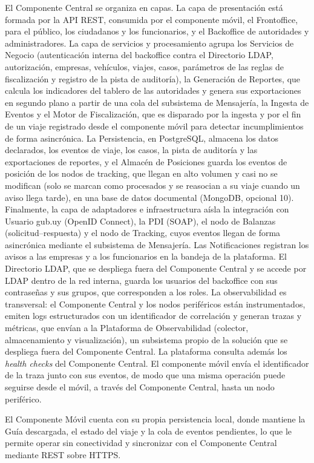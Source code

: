 El Componente Central se organiza en capas. La capa de presentación está formada por la API REST, consumida por el componente móvil, el Frontoffice, para el público, los ciudadanos y los funcionarios, y el Backoffice de autoridades y administradores. La capa de servicios y procesamiento agrupa los Servicios de Negocio (autenticación interna del backoffice contra el Directorio LDAP, autorización, empresas, vehículos, viajes, casos, parámetros de las reglas de fiscalización y registro de la pista de auditoría), la Generación de Reportes, que calcula los indicadores del tablero de las autoridades y genera sus exportaciones en segundo plano a partir de una cola del subsistema de Mensajería, la Ingesta de Eventos y el Motor de Fiscalización, que es disparado por la ingesta y por el fin de un viaje registrado desde el componente móvil para detectar incumplimientos de forma asincrónica. La Persistencia, en PostgreSQL, almacena los datos declarados, los eventos de viaje, los casos, la pista de auditoría y las exportaciones de reportes, y el Almacén de Posiciones guarda los eventos de posición de los nodos de tracking, que llegan en alto volumen y casi no se modifican (solo se marcan como procesados y se reasocian a su viaje cuando un aviso llega tarde), en una base de datos documental (MongoDB, opcional 10). Finalmente, la capa de adaptadores e infraestructura aísla la integración con Usuario gub.uy (OpenID Connect), la PDI (SOAP), el nodo de Balanzas (solicitud--respuesta) y el nodo de Tracking, cuyos eventos llegan de forma asincrónica mediante el subsistema de Mensajería. Las Notificaciones registran los avisos a las empresas y a los funcionarios en la bandeja de la plataforma. El Directorio LDAP, que se despliega fuera del Componente Central y se accede por LDAP dentro de la red interna, guarda los usuarios del backoffice con sus contraseñas y sus grupos, que corresponden a los roles. La observabilidad es transversal: el Componente Central y los nodos periféricos están instrumentados, emiten logs estructurados con un identificador de correlación y generan trazas y métricas, que envían a la Plataforma de Observabilidad (colector, almacenamiento y visualización), un subsistema propio de la solución que se despliega fuera del Componente Central. La plataforma consulta además los \emph{health checks} del Componente Central. El componente móvil envía el identificador de la traza junto con sus eventos, de modo que una misma operación puede seguirse desde el móvil, a través del Componente Central, hasta un nodo periférico.

El Componente Móvil cuenta con su propia persistencia local, donde mantiene la Guía descargada, el estado del viaje y la cola de eventos pendientes, lo que le permite operar sin conectividad y sincronizar con el Componente Central mediante REST sobre HTTPS.

